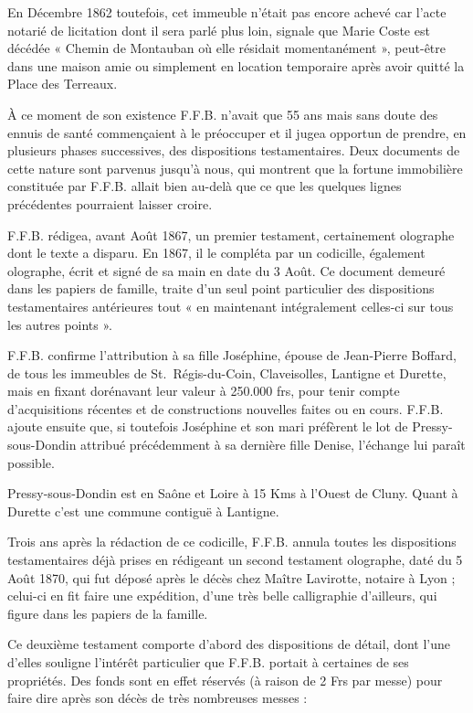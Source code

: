 \documentclass[11pt,a4paper]{report}
\begin{document}
En Décembre 1862 toutefois, cet immeuble n'était pas encore achevé car l'acte notarié de licitation dont il sera parlé plus loin, signale que Marie Coste est décédée « Chemin de Montauban où elle résidait momentanément », peut-être dans une maison amie ou simplement en location temporaire après avoir quitté la Place des Terreaux.

À ce moment de son existence F.F.B. n'avait que 55 ans mais sans doute des ennuis de santé commençaient à le préoccuper et il jugea opportun de prendre, en plusieurs phases successives, des dispositions testamentaires. Deux documents de cette nature sont parvenus jusqu'à nous, qui montrent que la fortune immobilière constituée par F.F.B. allait bien au-delà que ce que les quelques lignes précédentes pourraient laisser croire.

F.F.B. rédigea, avant Août 1867, un premier testament, certainement olographe dont le texte a disparu. En 1867, il le compléta par un codicille, également olographe, écrit et signé de sa main en date du 3 Août. Ce document demeuré dans les papiers de famille, traite d'un seul point particulier des dispositions testamentaires antérieures tout « en maintenant intégralement celles-ci sur tous les autres points ».


F.F.B. confirme l'attribution à sa fille Joséphine, épouse de Jean-Pierre Boffard, de tous les immeubles de St.~Régis-du-Coin, Claveisolles, Lantigne et Durette, mais en fixant dorénavant leur valeur à 250.000 frs, pour tenir compte d'acquisitions récentes et de constructions nouvelles faites ou en cours. F.F.B. ajoute ensuite que, si toutefois Joséphine et son mari préfèrent le lot de Pressy-sous-Dondin attribué précédemment à sa dernière fille Denise, l'échange lui paraît possible.

Pressy-sous-Dondin est en Saône et Loire à 15 Kms à l'Ouest de Cluny. Quant à Durette c'est une commune contiguë à Lantigne.

Trois ans après la rédaction de ce codicille, F.F.B. annula toutes les dispositions testamentaires déjà prises en rédigeant un second testament olographe, daté du 5 Août 1870, qui fut déposé après le décès chez Maître Lavirotte, notaire à Lyon ; celui-ci en fit faire une expédition, d'une très belle calligraphie d'ailleurs, qui figure dans les papiers de la famille.

Ce deuxième testament comporte d'abord des dispositions de détail, dont l'une d'elles souligne l'intérêt particulier que F.F.B. portait à certaines de ses propriétés. Des fonds sont en effet réservés (à raison de 2 Frs par messe) pour faire dire après son décès de très nombreuses messes :
\end{document}
